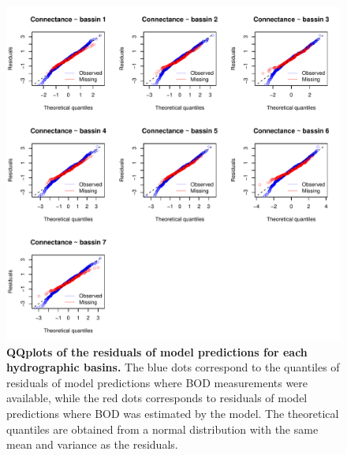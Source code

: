 \documentclass[11pt, oneside]{article}
\begin{document}
\begin{figure}[H]
\begin{center}
\includegraphics[page=1, width=1\linewidth]{b0_6_2/out_con/fig_qqplot_residuals.pdf}
\caption{
    \textbf{QQplots of the residuals of model predictions for each hydrographic basins.}
    The blue dots correspond to the quantiles of residuals of model predictions where BOD measurements were available, while the red dots corresponds to residuals of model predictions where BOD was estimated by the model.
    The theoretical quantiles are obtained from a normal distribution with the same mean and variance as the residuals.
} 
\end{center}
\end{figure}
\end{document}
